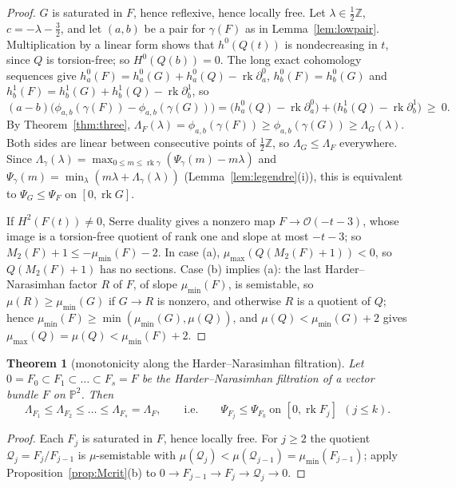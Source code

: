 \documentclass[11pt]{amsart}
\newtheorem{theorem}{Theorem}[section]
\theoremstyle{definition}
\theoremstyle{remark}
\newcommand{\PP}{\mathbb{P}}
\newcommand{\ZZ}{\mathbb{Z}}
\newcommand{\OO}{\mathcal{O}}
\newcommand{\cQ}{\mathcal{Q}}
\DeclareMathOperator{\rk}{rk}
\begin{document}
\begin{proof}
$G$ is saturated in $F$, hence reflexive, hence locally free. Let $\lambda\in\frac12\ZZ$, $c=-\lambda-\frac32$, and let $(a,b)$ be a pair for $\gamma(F)$ as in Lemma~\ref{lem:lowpair}. Multiplication by a linear form shows that $h^0(Q(t))$ is nondecreasing in $t$, since $Q$ is torsion-free; so $H^0(Q(b))=0$. The long exact cohomology sequences give $h^0_a(F)=h^0_a(G)+h^0_a(Q)-\rk\partial^0_a$, $h^0_b(F)=h^0_b(G)$ and $h^1_b(F)=h^1_b(G)+h^1_b(Q)-\rk\partial^1_b$, so
\[
(a-b)\big(\phi_{a,b}(\gamma(F))-\phi_{a,b}(\gamma(G))\big)=\big(h^0_a(Q)-\rk\partial^0_a\big)+\big(h^1_b(Q)-\rk\partial^1_b\big)\ \ge\ 0 .
\]
By Theorem~\ref{thm:three}, $\Lambda_F(\lambda)=\phi_{a,b}(\gamma(F))\ge\phi_{a,b}(\gamma(G))\ge\Lambda_G(\lambda)$. Both sides are linear between consecutive points of $\frac12\ZZ$, so $\Lambda_G\le\Lambda_F$ everywhere. Since $\Lambda_\gamma(\lambda)=\max_{0\le m\le\rk\gamma}(\Psi_\gamma(m)-m\lambda)$ and $\Psi_\gamma(m)=\min_\lambda(m\lambda+\Lambda_\gamma(\lambda))$ (Lemma~\ref{lem:legendre}(i)), this is equivalent to $\Psi_G\le\Psi_F$ on $[0,\rk G]$.

If $H^2(F(t))\ne0$, Serre duality gives a nonzero map $F\to\OO(-t-3)$, whose image is a torsion-free quotient of rank one and slope at most $-t-3$; so $M_2(F)+1\le-\mu_{\min}(F)-2$. In case (a), $\mu_{\max}(Q(M_2(F)+1))<0$, so $Q(M_2(F)+1)$ has no sections. Case (b) implies (a): the last Harder--Narasimhan factor $R$ of $F$, of slope $\mu_{\min}(F)$, is semistable, so $\mu(R)\ge\mu_{\min}(G)$ if $G\to R$ is nonzero, and otherwise $R$ is a quotient of $Q$; hence $\mu_{\min}(F)\ge\min(\mu_{\min}(G),\mu(Q))$, and $\mu(Q)<\mu_{\min}(G)+2$ gives $\mu_{\max}(Q)=\mu(Q)<\mu_{\min}(F)+2$.
\end{proof}

\begin{theorem}[monotonicity along the Harder--Narasimhan filtration]\label{thm:HNmono}
Let $0=F_0\subset F_1\subset\dots\subset F_s=F$ be the Harder--Narasimhan filtration of a vector bundle $F$ on $\PP^2$. Then
\[
\Lambda_{F_1}\le\Lambda_{F_2}\le\dots\le\Lambda_{F_s}=\Lambda_F,\qquad\text{i.e.}\qquad \Psi_{F_j}\le\Psi_{F_k}\ \text{on }[0,\rk F_j]\ \ (j\le k).
\]
\end{theorem}

\begin{proof}
Each $F_j$ is saturated in $F$, hence locally free. For $j\ge2$ the quotient $\cQ_j=F_j/F_{j-1}$ is $\mu$-semistable with $\mu(\cQ_j)<\mu(\cQ_{j-1})=\mu_{\min}(F_{j-1})$; apply Proposition~\ref{prop:Mcrit}(b) to $0\to F_{j-1}\to F_j\to\cQ_j\to0$.
\end{proof}
\end{document}
